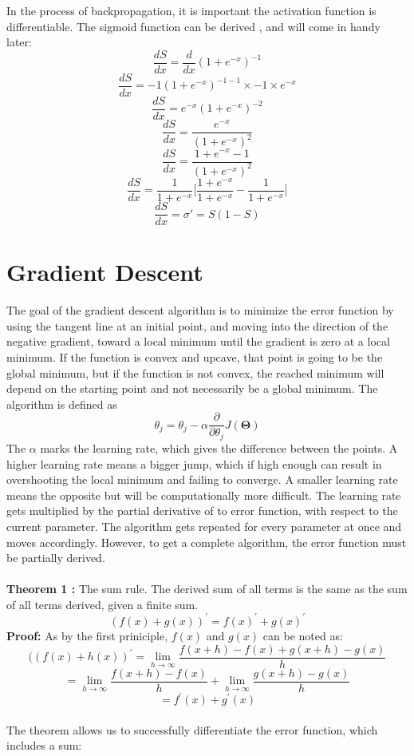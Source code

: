 \documentclass[a4paper,12pt]{article}
\begin{document}
In the process of backpropagation, it is important the activation function is differentiable. The sigmoid function can be derived \cite{backpropagation}, and will come in handy later:
\[\frac{dS}{dx} = \frac{d}{dx}(1+e^{-x})^{-1}\]
\[\frac{dS}{dx} = -1(1+e^{-x})^{-1-1} \times -1 \times e^{-x}\]
\[\frac{dS}{dx} = e^{-x}(1+e^{-x})^{-2}\]
\[\frac{dS}{dx} = \frac{e^{-x}}{(1+e^{-x})^2}\]
\[\frac{dS}{dx} = \frac{1 + e^{-x} - 1}{(1+e^{-x})^2}\]
\[\frac{dS}{dx} = \frac{1}{1+e^{-x}}\bigg[\frac{1+e^{-x}}{1+e^{-x}} - \frac{1}{1+e^{-x}}\bigg] \]
\[\frac{dS}{dx} = \sigma' = S(1-S)\]

\section{Gradient Descent}
The goal of the gradient descent algorithm is to minimize the error function by using the tangent line at an initial point, and moving into the direction of the negative gradient, toward a local minimum until the gradient is zero at a local minimum. If the function is convex and upcave, that point is going to be the global minimum, but if the function is not convex, the reached minimum will depend on the starting point and not necessarily be a global minimum. The algorithm is defined as \cite{deeplearning} \[\theta_j = \theta_j - \alpha \frac{\partial}{\partial\theta_j} J(\boldsymbol{\Theta})\] The \(\alpha\) marks the learning rate, which gives the difference between the points. A higher learning rate means a bigger jump, which if high enough can result in overshooting the local minimum and failing to converge. A smaller learning rate means the opposite but will be computationally more difficult. The learning rate gets multiplied by the partial derivative of to error function, with respect to the current parameter. The algorithm gets repeated for every parameter at once and moves accordingly. However, to get a complete algorithm, the error function must be partially derived. 
\\
\\
\textbf{Theorem 1 \cite{sumrule}:} The sum rule. The derived sum of all terms is the same as the sum of all terms derived, given a finite sum.
\[(f(x) + g(x))^{'} = f(x)^{'} + g(x)^{'} \]
\textbf{Proof:} As by the first priniciple, $f(x)$ and $g(x)$ can be noted as:
\[((f(x)+h(x))^{'} = \lim_{h\to\infty} \frac{f(x+h) - f(x) + g(x+h) - g(x)}{h}\] 
\[= \lim_{h\to\infty} \frac{f(x+h) - f(x)}{h} + \lim_{h\to\infty} \frac{g(x+h) - g(x)}{h}\]
\[= f^{'}(x) + g^{'}(x)\]
\\
The theorem allows us to successfully differentiate the error function, which includes a sum:
\end{document}
